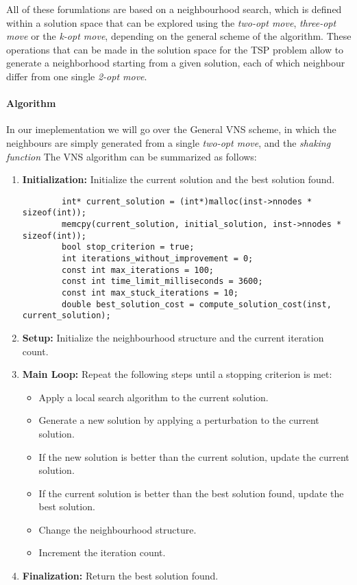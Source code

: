\documentclass{article}
\begin{document}
All of these forumlations are based on a neighbourhood search, which is defined within a solution space that can be explored using the \textit{two-opt move}, 
\textit{three-opt move} or the \textit{k-opt move}, depending on the general scheme of the algorithm. These operations that can be made in the solution space for the TSP problem allow to generate a neighborhood
starting from a given solution, each of which neighbour differ from one single \textit{2-opt move}\cite{Heuristics_for_the_Traveling_Salesman_Problem}. 

\paragraph{Algorithm}
In our imeplementation we will go over the General VNS scheme, in which the neighbours are simply generated from a single \textit{two-opt move}, and the \textit{shaking function} 
The VNS algorithm can be summarized as follows:
\begin{enumerate}
	\item \textbf{Initialization:} Initialize the current solution and the best solution found.
	\begin{lstlisting}
		int* current_solution = (int*)malloc(inst->nnodes * sizeof(int));
		memcpy(current_solution, initial_solution, inst->nnodes * sizeof(int));
		bool stop_criterion = true;
		int iterations_without_improvement = 0;
		const int max_iterations = 100;
		const int time_limit_milliseconds = 3600;
		const int max_stuck_iterations = 10;
		double best_solution_cost = compute_solution_cost(inst, current_solution);
	\end{lstlisting}
	\item \textbf{Setup:} Initialize the neighbourhood structure and the current iteration count.
	\item \textbf{Main Loop:} Repeat the following steps until a stopping criterion is met:
		  \begin{itemize}
			  \item Apply a local search algorithm to the current solution.
			  \item Generate a new solution by applying a perturbation to the current solution.
			  \item If the new solution is better than the current solution, update the current solution.
			  \item If the current solution is better than the best solution found, update the best solution.
			  \item Change the neighbourhood structure.
			  \item Increment the iteration count.
		  \end{itemize}
	\item \textbf{Finalization:} Return the best solution found.
\end{enumerate}
\end{document}
